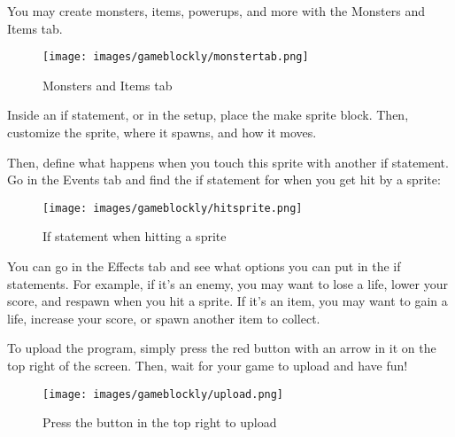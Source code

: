 \documentclass{article}
\begin{document}
You may create monsters, items, powerups, and more with the Monsters and Items tab.  

\begin{figure}[h!]
  {\centering
    \texttt{[image: images/gameblockly/monstertab.png]}
    \caption{Monsters and Items tab}
    }
\end{figure}
Inside an if statement, or in the setup, place the make sprite block.  Then, customize the sprite, where it spawns, and how it moves.

Then, define what happens when you touch this sprite with another if statement.  Go in the Events tab and find the if statement for when you get hit by a sprite:

\begin{figure}[h!]
    {\centering
    \texttt{[image: images/gameblockly/hitsprite.png]}
    \caption{If statement when hitting a sprite}
    }
\end{figure}

You can go in the Effects tab and see what options you can put in the if statements.  For example, if it's an enemy, you may want to lose a life, lower your score, and respawn when you hit a sprite.  If it's an item, you may want to gain a life, increase your score, or spawn another item to collect.

To upload the program, simply press the red button with an arrow in it on the top right of the screen.  Then, wait for your game to upload and have fun!

\begin{figure}[h!]
    {\centering
    \texttt{[image: images/gameblockly/upload.png]}
    \caption{Press the button in the top right to upload}
    }
\end{figure}

\newpage
\end{document}
